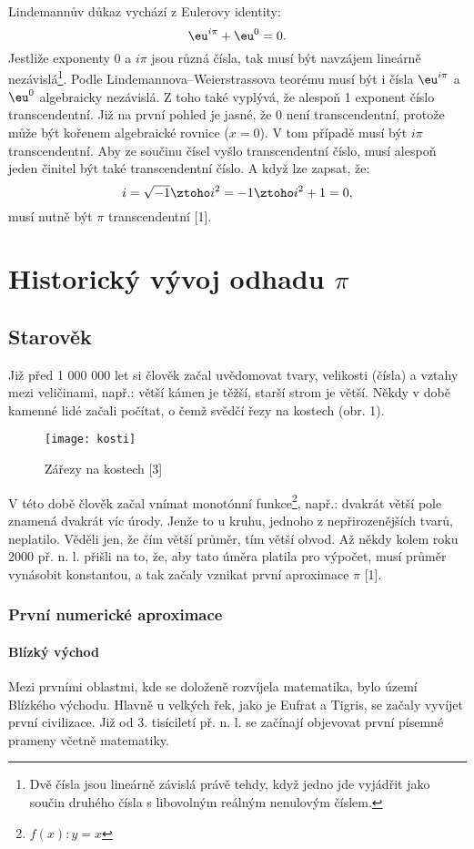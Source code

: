 \documentclass[soc]{gzwroc} %
\begin{document}
Lindemannův důkaz vychází z Eulerovy identity:
$$
\eu^{i\pi}+\eu^{0}=0.
$$
Jestliže exponenty 0 a $i\pi$ jsou různá čísla, tak musí být navzájem lineárně nezávislá\footnote[4]{Dvě čísla jsou lineárně závislá právě tehdy, když jedno jde vyjádřit jako součin druhého čísla s libovolným reálným nenulovým číslem.}. Podle Lindemannova–Weierstrassova teorému musí být i čísla $\eu^{i\pi}$ a $\eu^{0}$ algebraicky nezávislá. Z toho také vyplývá, že alespoň 1 exponent číslo transcendentní. Již na první pohled je jasné, že 0 není transcendentní, protože může být kořenem algebraické rovnice ($x=0$). V tom případě musí být $i\pi$ transcendentní. Aby ze součinu čísel vyšlo transcendentní číslo, musí alespoň jeden činitel být také transcendentní číslo. A když lze zapsat, že:
$$
i=\sqrt{-1} \ztoho i^2=-1 \ztoho i^2+1=0,
$$
musí nutně být $\pi$ transcendentní [1].
\section{Historický vývoj odhadu $\pi$}
\subsection{Starověk}
Již před 1 000 000 let si člověk začal uvědomovat tvary, velikosti (čísla) a vztahy mezi veličinami, např.: větší kámen je těžší, starší strom je větší. Někdy v době kamenné lidé začali počítat, o čemž svědčí řezy na kostech (obr. 1).
\begin{figure}[!ht]
\texttt{[image: kosti]}
\caption{Zářezy na kostech [3]}
\label{fig:kruh}
\end{figure}
V této době člověk začal vnímat monotónní funkce\footnote[5]{$f(x): y=x$}, např.: dvakrát větší pole znamená dvakrát víc úrody. Jenže to u kruhu, jednoho z nepřirozenějších tvarů, neplatilo. Věděli jen, že čím větší průměr, tím větší obvod. Až někdy kolem roku 2000 př. n. l. přišli na to, že, aby tato úměra platila pro výpočet, musí průměr vynásobit konstantou, a tak začaly vznikat první aproximace $\pi$ [1].
\subsubsection{První numerické aproximace}
\paragraph{Blízký východ}
Mezi prvními oblastmi, kde se doloženě rozvíjela matematika, bylo území Blízkého východu. Hlavně u velkých řek, jako je Eufrat a Tigris, se začaly vyvíjet první civilizace. Již od 3. tisíciletí př. n. l. se začínají objevovat první písemné prameny včetně matematiky.
\end{document}
